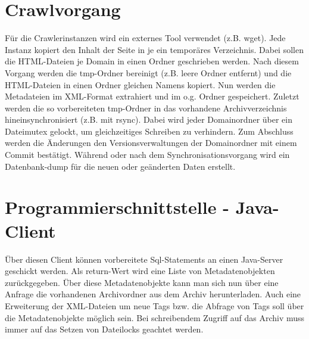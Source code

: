\chapter{Crawlvorgang}
Für die Crawlerinstanzen wird ein externes Tool verwendet (z.B. wget).
Jede Instanz kopiert den Inhalt der Seite in je ein temporäres Verzeichnis.
Dabei sollen die HTML-Dateien je Domain in einen Ordner geschrieben werden.
Nach diesem Vorgang werden die tmp-Ordner bereinigt (z.B. leere Ordner entfernt)
und die HTML-Dateien in einen Ordner gleichen Namens kopiert.
Nun werden die Metadateien im XML-Format extrahiert und im o.g. Ordner gespeichert.
Zuletzt werden die so vorbereiteten tmp-Ordner in das vorhandene Archivverzeichnis
hineinsynchronisiert (z.B. mit rsync). Dabei wird jeder Domainordner über ein Dateimutex gelockt, um
gleichzeitiges Schreiben zu verhindern.
Zum Abschluss werden die Änderungen den Versionsverwaltungen der Domainordner mit einem Commit bestätigt.
Während oder nach dem Synchronisationsvorgang wird ein Datenbank-dump für die neuen oder geänderten Daten
erstellt. 

\chapter{Programmierschnittstelle - Java-Client}
Über diesen Client können vorbereitete Sql-Statements an einen Java-Server geschickt werden. Als return-Wert
wird eine Liste von Metadatenobjekten zurückgegeben.
Über diese Metadatenobjekte kann man sich nun über eine Anfrage die vorhandenen Archivordner aus dem Archiv herunterladen.
Auch eine Erweiterung der XML-Dateien um neue Tags bzw. die Abfrage von Tags soll über die 
Metadatenobjekte möglich sein.
Bei schreibendem Zugriff auf das Archiv muss immer auf das Setzen von Dateilocks geachtet werden.


 
